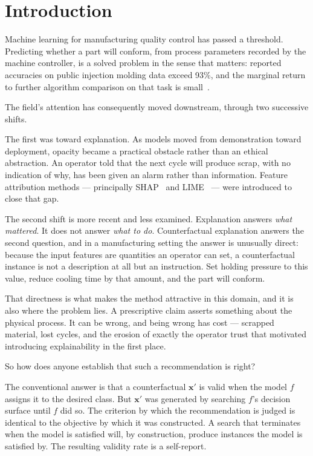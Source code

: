 \documentclass[11pt,a4paper]{article}
\begin{document}
\section{Introduction}

Machine learning for manufacturing quality control has passed a threshold. Predicting whether a part will conform, from process parameters recorded by the machine controller, is a solved problem in the sense that matters: reported accuracies on public injection molding data exceed 93\%, and the marginal return to further algorithm comparison on that task is small~\cite{polenta2022,parizs2022}.

The field's attention has consequently moved downstream, through two successive shifts.

The first was toward explanation. As models moved from demonstration toward deployment, opacity became a practical obstacle rather than an ethical abstraction. An operator told that the next cycle will produce scrap, with no indication of why, has been given an alarm rather than information. Feature attribution methods --- principally SHAP~\cite{lundberg2017} and LIME~\cite{ribeiro2016} --- were introduced to close that gap.

The second shift is more recent and less examined. Explanation answers \emph{what mattered}. It does not answer \emph{what to do}. Counterfactual explanation answers the second question, and in a manufacturing setting the answer is unusually direct: because the input features are quantities an operator can set, a counterfactual instance is not a description at all but an instruction. Set holding pressure to this value, reduce cooling time by that amount, and the part will conform.

That directness is what makes the method attractive in this domain, and it is also where the problem lies. A prescriptive claim asserts something about the physical process. It can be wrong, and being wrong has cost --- scrapped material, lost cycles, and the erosion of exactly the operator trust that motivated introducing explainability in the first place.

So how does anyone establish that such a recommendation is right?

The conventional answer is that a counterfactual $\mathbf{x}'$ is valid when the model $f$ assigns it to the desired class. But $\mathbf{x}'$ was generated by searching $f$'s decision surface until $f$ did so. The criterion by which the recommendation is judged is identical to the objective by which it was constructed. A search that terminates when the model is satisfied will, by construction, produce instances the model is satisfied by. The resulting validity rate is a self-report.
\end{document}
